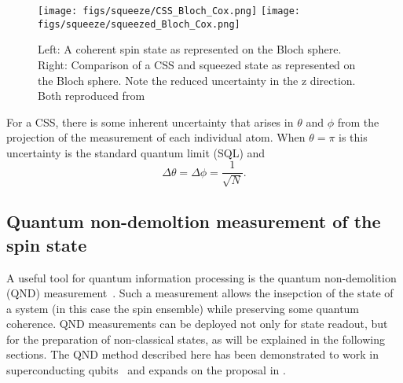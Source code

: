 \documentclass{article}
\begin{document}
\begin{figure}
  \centering
  \texttt{[image: figs/squeeze/CSS\_Bloch\_Cox.png]}
  \texttt{[image: figs/squeeze/squeezed\_Bloch\_Cox.png]}
  \caption{Left: A coherent spin state as represented on the Bloch sphere.
  Right: Comparison of a CSS and squeezed state as represented on the Bloch
  sphere. Note the reduced uncertainty in the z direction.
  Both reproduced from~\cite{Cox2016}}
  \label{CSSbloch}
\end{figure}



For a CSS, there is some inherent uncertainty that arises in $\theta$ and
$\phi$ from the projection of the measurement of each individual atom. When
$\theta=\pi$ is this uncertainty is the standard quantum limit (SQL) and
~\cite{Cox2016}
\begin{equation}
  \Delta \theta = \Delta \phi = \frac{1}{\sqrt{N}}.
\end{equation}

\subsection{Quantum non-demoltion measurement of the spin state}



A useful tool for quantum information processing is the quantum non-demolition
(QND) measurement~\cite{}. Such a measurement allows the insepction of the
state of a system (in this case the spin ensemble) while preserving some
quantum coherence. QND measurements can be deployed not only for state readout,
but for the preparation of non-classical states, as will be explained in the
following sections. The QND method described here has been demonstrated to work
in superconducting qubits~\cite{PhysRevA.69.062320} and expands on the proposal
in \cite{Andre2006}.
\end{document}
